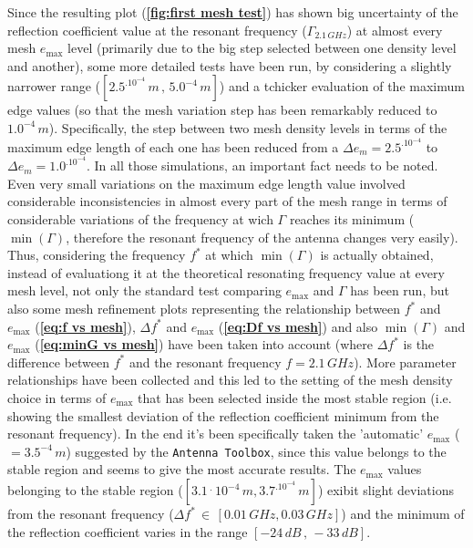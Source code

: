 \documentclass[12pt,a4paper]{article}
\begin{document}
{Since the resulting plot  (\textbf{\cref{fig:first mesh test}}) has shown big uncertainty of the reflection coefficient value at the resonant frequency ($\Gamma_{2.1\,GHz}$) at almost every mesh $e_{\max}$ level (primarily due to the big step selected between one density level and another), some more detailed tests have been run, by considering a slightly narrower range ($[2.5^.10^{-4}\,m\,,\,5.0^{-4}\,m]$) and a tchicker evaluation of the maximum edge values (so that the mesh variation step has been remarkably reduced to $1.0^{-4}\,m$). Specifically, the step between two mesh density levels in terms of the maximum edge length of each one has been reduced from a $\Delta e_m=2.5^.10^{-4}$ to $\Delta e_m=1.0^.10^{-4}$. In all those simulations, an important fact needs to be noted. Even very small variations on the maximum edge length value involved considerable inconsistencies in almost every part of the mesh range in terms of considerable variations of the frequency at wich $\Gamma$ reaches its minimum ($\min(\Gamma)$, therefore the resonant frequency of the antenna changes very easily).  
Thus, considering the frequency $f^*$ at which $\min(\Gamma)$ is actually obtained, instead of evaluationg it at the theoretical resonating frequency value at every mesh level, not only the standard test comparing $e_{\max}$ and $\Gamma$ has been run, but also some mesh refinement plots representing the relationship between $f^*$ and $e_{\max}$ (\textbf{\cref{eq:f vs mesh}}), $\Delta f^*$ and $e_{\max}$ (\textbf{\cref{eq:Df vs mesh}}) and also $\min(\Gamma)$ and $e_{\max}$ (\textbf{\cref{eq:minG vs mesh}}) have been taken into account (where $\Delta f^*$ is the difference between $f^*$ and the resonant frequency $f=2.1\,GHz$). More parameter relationships have been collected and this led to the setting of the mesh density choice in terms of $e_{\max}$ that has been selected inside the most stable region (i.e. showing the smallest deviation of the reflection coefficient minimum from the resonant frequency). In the end it's been specifically taken the 'automatic' $e_{\max}$ ($=3.5^{-4}\,m$) suggested by the \texttt{\color{Mahogany}Antenna Toolbox}, since this value  belongs to the stable region and seems to give the most accurate results. The $e_{\max}$ values belonging to the stable region ($[3.1\,^.\,10^{-4}\,m,3.7^.10^{-4}\,m]$) exibit slight deviations from the resonant frequency ($\Delta f^*\,\in\,[0.01\,GHz,0.03\,GHz]$) and the minimum of the reflection coefficient varies in the range $[-24\,dB\,,\,-33\,dB]$. 
\begin{figure}[h]
	\begin{center}
		

\end{center}
\end{figure}}
\end{document}
